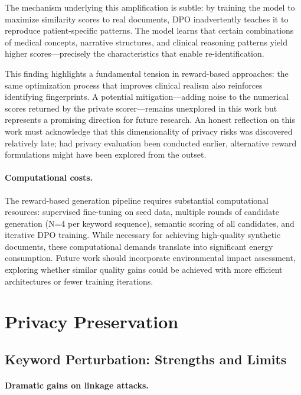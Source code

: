The mechanism underlying this amplification is subtle: by training the model to maximize similarity scores to real documents, DPO inadvertently teaches it to reproduce patient-specific patterns.
The model learns that certain combinations of medical concepts, narrative structures, and clinical reasoning patterns yield higher scores—precisely the characteristics that enable re-identification.

This finding highlights a fundamental tension in reward-based approaches: the same optimization process that improves clinical realism also reinforces identifying fingerprints.
A potential mitigation—adding noise to the numerical scores returned by the private scorer—remains unexplored in this work but represents a promising direction for future research.
An honest reflection on this work must acknowledge that this dimensionality of privacy risks was discovered relatively late; had privacy evaluation been conducted earlier, alternative reward formulations might have been explored from the outset.

\paragraph{Computational costs.}

The reward-based generation pipeline requires substantial computational resources: supervised fine-tuning on seed data, multiple rounds of candidate generation (N=4 per keyword sequence), semantic scoring of all candidates, and iterative DPO training.
While necessary for achieving high-quality synthetic documents, these computational demands translate into significant energy consumption.
Future work should incorporate environmental impact assessment, exploring whether similar quality gains could be achieved with more efficient architectures or fewer training iterations.


\section{Privacy Preservation}


\subsection{Keyword Perturbation: Strengths and Limits}

\paragraph{Dramatic gains on linkage attacks.}

